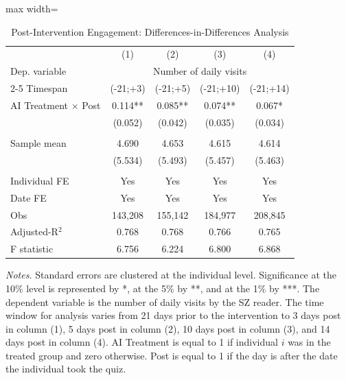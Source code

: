  \begin{table}[H]
 \centering 
 \caption{Post-Intervention Engagement: Differences-in-Differences Analysis} 
 \label{tab:results_visits_baseline} 
 \begin{adjustbox}{max width=\textwidth} 
\begin{tabular}{lcccc} 
 \toprule
& (1) & (2) & (3) & (4)  \\
 Dep. variable & \multicolumn{4}{c}{Number of daily visits} \\ 
 \cmidrule(lr){2-5} 
Timespan
 & (-21;+3) & (-21;+5) & (-21;+10) & (-21;+14) \\
 \midrule 
AI Treatment $\times$ Post&    0.114** &    0.085** &    0.074** &    0.067*  \\
                &  (0.052)   &  (0.042)   &  (0.035)   &  (0.034)   \\
& & & &  \\
Sample mean&      4.690 &      4.653 &      4.615 &      4.614  \\
& (5.534) & (5.493) & (5.457) & (5.463)  \\
& & & &  \\
Individual FE & Yes & Yes & Yes  & Yes\\
Date FE & Yes & Yes & Yes & Yes\\
 \midrule
Obs &    143,208 &    155,142 &    184,977 &    208,845  \\
Adjusted-R$^2$ &      0.768 &      0.768 &      0.766 &      0.765  \\
F statistic &      6.756 &      6.224 &      6.800 &      6.868  \\
 \bottomrule
 \end{tabular}
 \end{adjustbox}
 \par
 \begin{minipage}{0.82\linewidth}
 \baselineskip9pt {\scriptsize \vspace{0.1cm} { \it Notes.} Standard errors are clustered at the individual level. Significance at the 10\% level is represented by *, at the 5\% by **, and at the 1\% by ***. The dependent variable is the number of daily visits by the SZ reader. The time window for analysis varies from 21 days prior to the intervention to 3 days post in column (1), 5 days post in column (2), 10 days post in column (3), and 14 days post in column (4). AI Treatment is equal to 1 if individual $i$ was in the treated group and zero otherwise. Post is equal to 1 if the day is after the date the individual took the quiz.}
 \end{minipage}
 \end{table}
